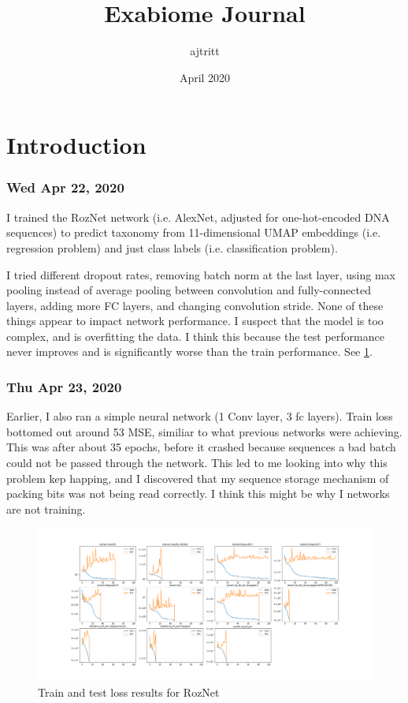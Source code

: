 \documentclass{article}
\title{Exabiome Journal}
\author{ajtritt }
\date{April 2020}
\begin{document}
\maketitle

\section{Introduction}

\subsubsection*{Wed Apr 22, 2020}

I trained the RozNet network (i.e. AlexNet, adjusted for one-hot-encoded DNA sequences) to predict taxonomy
from 11-dimensional UMAP embeddings (i.e. regression problem) and just class labels (i.e. classification problem).

I tried different dropout rates, removing batch norm at the last layer, using max pooling instead of average pooling
between convolution and fully-connected layers, adding more FC layers, and changing convolution stride. None of these
things appear to impact network performance. I suspect that the model is too complex, and is overfitting the data. I
think this because the test performance never improves and is significantly worse than the train performance. See
\ref{fig:roznet_train_test}.

\subsubsection*{Thu Apr 23, 2020}
Earlier, I also ran a simple neural network (1 Conv layer, 3 fc layers). Train loss bottomed out around 53 MSE, similiar
to what previous networks were achieving. This was after about 35 epochs, before it crashed because sequences a bad
batch could not be passed through the network. This led to me looking into why this problem kep happing, and I discovered
that my sequence storage mechanism of packing bits was not being read correctly. I think this might be why I networks are
not training.


\begin{figure}
  \includegraphics[width=\linewidth]{roznet_results.png}
  \caption{Train and test loss results for RozNet}
  \label{fig:roznet_train_test}
\end{figure}
\end{document}
